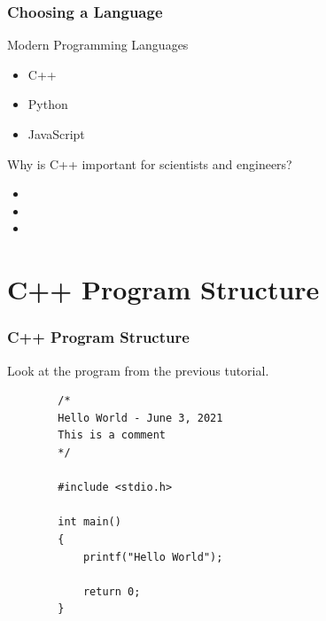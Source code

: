 \documentclass[fleqn]{beamer} %
\newcommand{\sectiontitleII}{Choosing a Language}
\newcommand{\sectiontitleIII}{C++ Program Structure}
\begin{document}
	\begin{frame} \small
		\frametitle{\sectiontitleII}
		
		Modern Programming Languages 
		\begin{itemize}
			\item C++
			\item Python
			\item JavaScript
		\end{itemize}
		
		Why is C++ important for scientists and engineers? 
		\begin{itemize}
			\item 
			\item
			\item
		\end{itemize}
	
	\end{frame}	

\section{\sectiontitleIII}

	\begin{frame}[label=sectionIII,containsverbatim] \small
		\frametitle{\sectiontitleIII}
		
		Look at the program from the previous tutorial.
		
		\begin{lstlisting}
		/*
		Hello World - June 3, 2021
		This is a comment
		*/
		
		#include <stdio.h>
		
		int main()
		{
			printf("Hello World");
		
			return 0;
		}
		
		\end{lstlisting}

	\end{frame}

\end{document}
